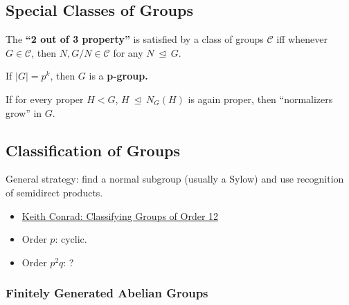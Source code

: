 \hypertarget{special-classes-of-groups-1}{%
\subsection{Special Classes of
Groups}\label{special-classes-of-groups-1}}

\begin{definition}

The \textbf{``2 out of 3 property''} is satisfied by a class of groups
\(\mathcal{C}\) iff whenever \(G \in \mathcal{C}\), then
\(N, G/N \in \mathcal{C}\) for any \(N {~\trianglelefteq~}G\).

\end{definition}

\begin{definition}[p-groups]

If \({\left\lvert {G} \right\rvert} = p^k\), then \(G\) is a
\textbf{p-group.}

\end{definition}

\begin{definition}

If for every proper \(H<G\), \(H{~\trianglelefteq~}N_G(H)\) is again
proper, then ``normalizers grow'' in \(G\).

\end{definition}

\hypertarget{classification-of-groups}{%
\subsection{Classification of Groups}\label{classification-of-groups}}

General strategy: find a normal subgroup (usually a Sylow) and use
recognition of semidirect products.

\begin{itemize}
\tightlist
\item
  \href{https://kconrad.math.uconn.edu/blurbs/grouptheory/group12.pdf}{Keith
  Conrad: Classifying Groups of Order 12}
\item
  Order \(p\): cyclic.
\item
  Order \(p^2q\): ?
\end{itemize}

\hypertarget{finitely-generated-abelian-groups}{%
\subsubsection{Finitely Generated Abelian
Groups}\label{finitely-generated-abelian-groups}}


